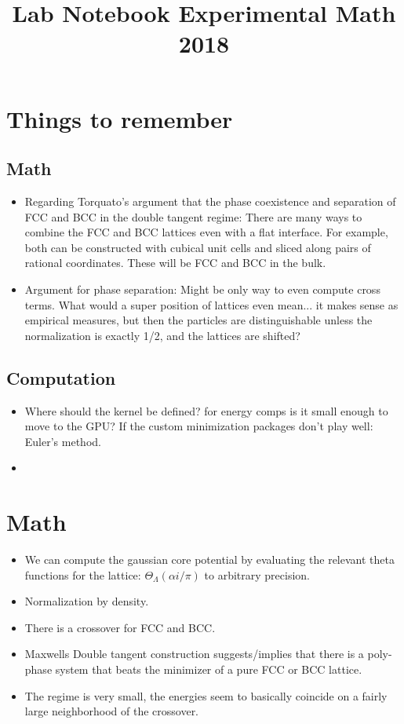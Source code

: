 \documentclass[onecolumn,11pt,final]{amsart}
\title{Lab Notebook Experimental Math 2018}
\author{}
\begin{document}


\maketitle

\section{Things to remember}
\subsection{Math}
\begin{itemize}
\item Regarding Torquato's argument that the phase coexistence and separation of FCC and BCC in the double tangent regime: There are many ways to combine the FCC and BCC lattices even with a flat interface. For example, both can be constructed with cubical unit cells and sliced along pairs of rational coordinates.  These will be FCC and BCC in the bulk.
\item Argument for phase separation:  Might be only way to even compute cross terms.  What would a super position of lattices even mean... it makes sense as empirical measures, but then the particles are distinguishable unless the normalization is exactly 1/2, and the lattices are shifted?
\end{itemize}

\subsection{Computation}

\begin{itemize}
\item Where should the kernel be defined?  for energy comps is it small enough to move to the GPU?
 If the custom minimization packages don't play well: Euler's method.

\item
\end{itemize}


\section{Math}

\begin{itemize}

\item We can compute the gaussian core potential by evaluating the relevant theta functions for the lattice: $\Theta_\Lambda(\alpha i/\pi)$ to arbitrary precision.
\item Normalization by density.
\item There is a crossover for FCC and BCC.
\item Maxwells Double tangent construction suggests/implies that there is a poly-phase system that beats the minimizer of a pure FCC or BCC lattice.
\item The regime is very small, the energies seem to basically coincide on a fairly large neighborhood of the crossover.
\end{itemize}
\end{document}
